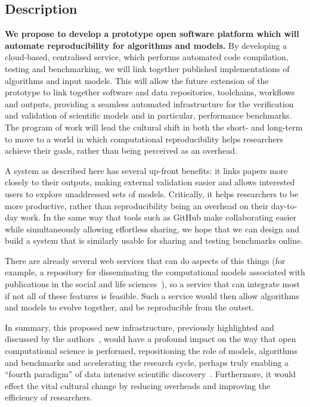 \documentclass[a4paper,11pt]{article}
\begin{document}
\subsection*{Description}
{\textbf{We propose to develop a prototype open software platform
which will automate reproducibility for algorithms and models.}}  By
developing a cloud-based, centralised service, which performs
automated code compilation, testing and benchmarking, we will link
together published implementations of algorithms and input
models. This will allow the future extension of the prototype to link
together software and data repositories, toolchains, workflows and
outputs, providing a seamless automated infrastructure for the
verification and validation of scientific models and in particular,
performance benchmarks. The program of work will lead the cultural
shift in both the short- and long-term to move to a world in which
computational reproducibility helps researchers achieve their goals,
rather than being perceived as an overhead.

A system as described here has several up-front benefits: it links
papers more closely to their outputs, making external validation
easier and allows interested users to explore unaddressed sets of
models. Critically, it helps researchers to be more productive, rather
than reproducibility being an overhead on their day-to-day work. In
the same way that tools such as GitHub make collaborating easier while
simultaneously allowing effortless sharing, we hope that we can design
and build a system that is similarly usable for sharing and testing
benchmarks online.

There are already several web services that can do aspects of this
things (for example, a repository for disseminating the computational
models associated with publications in the social and life
sciences~\cite{rollins-et-al:2014}), so a service that can integrate
most if not all of these features is feasible. Such a service would
then allow algorithms and models to evolve together, and be
reproducible from the outset.

In summary, this proposed new infrastructure, previously highlighted
and discussed by the
authors~\cite{crick-et-al_wssspe2,crick-et-al_recomp2014}, would have
a profound impact on the way that open computational science is
performed, repositioning the role of models, algorithms and benchmarks
and accelerating the research cycle, perhaps truly enabling a ``fourth
paradigm'' of data intensive scientific
discovery~\cite{hey:2009}. Furthermore, it would effect the vital
cultural change by reducing overheads and improving the efficiency of
researchers.
\end{document}
